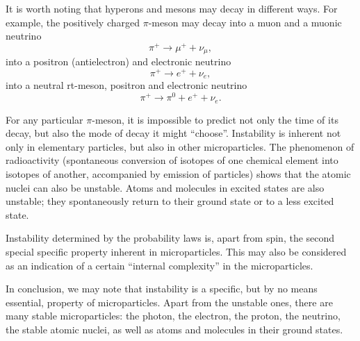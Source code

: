 \documentclass[a4paper,sfsidenotes,colorlinks=true]{tufte-book}
\numberwithin{equation}{section}
\numberwithin{figure}{section}
\begin{document}
It is worth noting that hyperons and mesons may decay in different
ways. For example, the positively charged $\pi$-meson may decay into a
muon and a muonic neutrino 
\begin{equation*}
\pi^{+} \to \mu^{+} + \nu_{\mu}, 
\end{equation*}
into a positron (antielectron) and electronic neutrino
\begin{equation*}
\pi^{+} \to e^{+} + \nu_{e},
\end{equation*}
into a neutral rt-meson, positron and electronic neutrino
\begin{equation*}
\pi^{+} \to  \pi^{0} + e^{+} + \nu_{e}.
\end{equation*}



For any particular $\pi$-meson, it is impossible to predict not only
the time of its decay, but also the mode of decay it might
``choose''. Instability is inherent not only in elementary particles,
but also in other microparticles. The phenomenon of radioactivity
(spontaneous conversion of isotopes of one chemical element into
isotopes of another, accompanied by emission of particles) shows that
the atomic nuclei can also be unstable. Atoms and molecules in excited
states are also unstable; they spontaneously return to their ground
state or to a less excited state.

Instability determined by the probability laws is, apart from spin,
the second special specific property inherent in microparticles. This
may also be considered as an indication of a certain ``internal
complexity'' in the microparticles. 

In conclusion, we may note that instability is a specific, but by no
means essential, property of microparticles. Apart from the unstable
ones, there are many stable microparticles: the photon, the electron,
the proton, the neutrino, the stable atomic nuclei, as well as atoms
and molecules in their ground states.  
\end{document}

